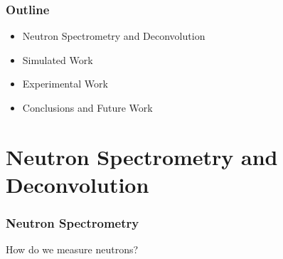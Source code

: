 \documentclass[fleqn]{beamer}
\begin{document}
\begin{frame}
\frametitle{Outline}
\begin{itemize}
\item Neutron Spectrometry and Deconvolution
\item Simulated Work
\item Experimental Work
\item Conclusions and Future Work
\end{itemize}
\end{frame}

\section{Neutron Spectrometry and Deconvolution}
\begin{frame}
\frametitle{Neutron Spectrometry}

How do we measure neutrons?

\end{frame}
\end{document}
